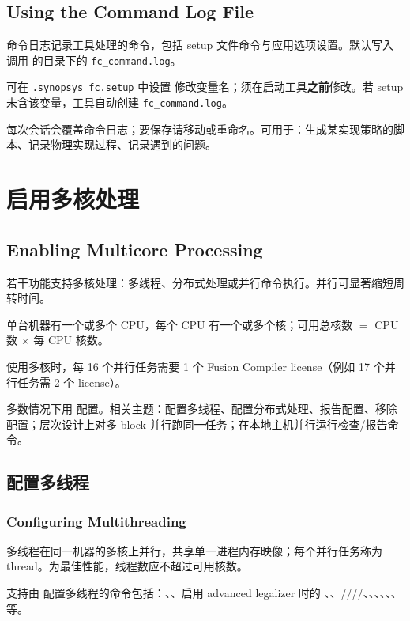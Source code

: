 \subsection*{Using the Command Log File}

命令日志记录工具处理的命令，包括 setup 文件命令与应用选项设置。默认写入调用  的目录下的 \texttt{fc\_command.log}。

可在 \texttt{.synopsys\_fc.setup} 中设置  修改变量名；须在启动工具\textbf{之前}修改。若 setup 未含该变量，工具自动创建 \texttt{fc\_command.log}。

每次会话会覆盖命令日志；要保存请移动或重命名。可用于：生成某实现策略的脚本、记录物理实现过程、记录遇到的问题。

\section{启用多核处理}
\subsection*{Enabling Multicore Processing}

若干功能支持多核处理：多线程、分布式处理或并行命令执行。并行可显著缩短周转时间。

\begin{noteBox}
单台机器有一个或多个 CPU，每个 CPU 有一个或多个核；可用总核数 $=$ CPU 数 $\times$ 每 CPU 核数。
\end{noteBox}

使用多核时，每 16 个并行任务需要 1 个 Fusion Compiler license（例如 17 个并行任务需 2 个 license）。

多数情况下用  配置。相关主题：配置多线程、配置分布式处理、报告配置、移除配置；层次设计上对多 block 并行跑同一任务；在本地主机并行运行检查/报告命令。

\subsection{配置多线程}
\subsubsection*{Configuring Multithreading}

多线程在同一机器的多核上并行，共享单一进程内存映像；每个并行任务称为 thread。为最佳性能，线程数应不超过可用核数。

支持由  配置多线程的命令包括：、、启用 advanced legalizer 时的 、、////、、、、、、 等。

